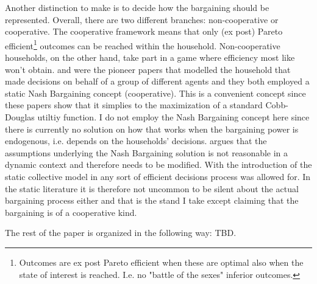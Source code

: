 Another distinction to make is to decide how the bargaining should be represented. Overall, there are two different branches: non-cooperative or cooperative. The cooperative framework means that only (ex post) Pareto efficient\footnote{Outcomes are ex post Pareto efficient when these are optimal also when the state of interest is reached. I.e. no "battle of the sexes" inferior outcomes.} outcomes can be reached within the household. Non-cooperative households, on the other hand, take part in a game where efficiency most like won't obtain. \cite{ManserBrown1980} and \cite{McElroyetal1981} were the pioneer papers that modelled the household that made decisions on behalf of a group of different agents and they both employed a static Nash Bargaining concept (cooperative). This is a convenient concept since these papers show that it simplies to the maximization of a standard Cobb-Douglas utiltiy function. I do not employ the Nash Bargaining concept here since there is currently no solution on how that works when the bargaining power is endogenous, i.e. depends on the households' decisions. \cite{Ligon2011} argues that the assumptions underlying the Nash Bargaining solution is not reasonable in a dynamic context and therefore needs to be modified. With the introduction of the static collective model in \cite{Chiappori1988,Chiappori1992} any sort of efficient decisions process was allowed for. In the static literature it is therefore not uncommon to  be silent about the actual bargaining process either and that is the stand I take except claiming that the bargaining is of a cooperative kind.  

The rest of the paper is organized in the following way: TBD. 


